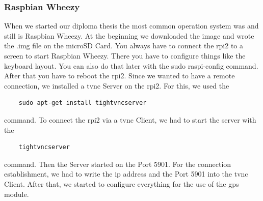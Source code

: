 \subsubsection{Raspbian Wheezy}
When we started our diploma thesis the most common operation system was and still is Raspbian Wheezy. At the beginning we downloaded the image and wrote the .img file on the microSD Card. You always have to connect the \gls{rpi2} to a screen to start Raspbian Wheezy. There you have to configure things like the keyboard layout. You can also do that later with the sudo raspi-config command. After that you have to reboot the \gls{rpi2}.
Since we wanted to have a remote connection, we installed a \gls{tvnc} Server on the \gls{rpi2}. For this, we used the  
\begin{verbatim}
	sudo apt-get install tightvncserver
\end{verbatim}
command.\newline
To connect the \gls{rpi2} via a \gls{tvnc} Client, we had to start the server with the 
\begin{verbatim}
	tightvncserver
\end{verbatim}
command. Then the Server started on the Port 5901. For the connection establishment, we had to write the \gls{ip} address and the Port 5901 into the \gls{tvnc} Client. After that, we started to configure everything for the use of the \gls{gps} module.
